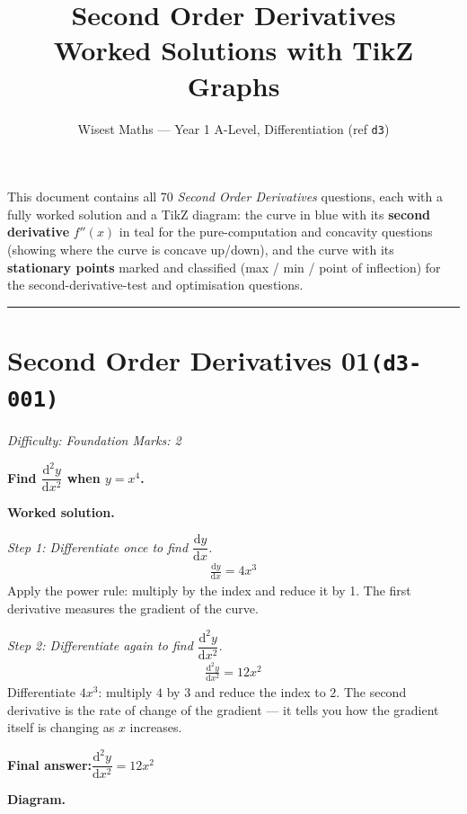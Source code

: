 \documentclass[11pt]{article}
\title{\textbf{Second Order Derivatives}\\[0.3em]\large Worked Solutions with TikZ Graphs}
\author{Wisest Maths --- Year 1 A-Level, Differentiation (ref \texttt{d3})}
\date{}
\newcommand{\question}[1]{\par\medskip\noindent\textbf{#1}\par}
\begin{document}
\maketitle
\noindent This document contains all 70 \emph{Second Order Derivatives} questions, each with a fully
worked solution and a TikZ diagram: the curve in blue with its \textbf{second derivative} $f''(x)$ in teal
for the pure-computation and concavity questions (showing where the curve is concave up/down), and the
curve with its \textbf{stationary points} marked and classified (max / min / point of inflection) for the
second-derivative-test and optimisation questions.
\tableofcontents
\bigskip
\hrule

\section*{Second Order Derivatives 01\quad\small\texttt{(d3-001)}}
\textit{Difficulty: Foundation \quad\textbar\quad Marks: 2}

\question{Find \( \dfrac{\mathrm{d}^2y}{\mathrm{d}x^2} \) when \( y = x^4 \).}

\textbf{Worked solution.}

\textit{Step 1: Differentiate once to find \( \dfrac{\mathrm{d}y}{\mathrm{d}x} \).}
\[\begin{gathered}
\frac{\mathrm{d}y}{\mathrm{d}x} = 4x^3
\end{gathered}\]
Apply the power rule: multiply by the index and reduce it by 1. The first derivative measures the gradient of the curve.

\textit{Step 2: Differentiate again to find \( \dfrac{\mathrm{d}^2y}{\mathrm{d}x^2} \).}
\[\begin{gathered}
\frac{\mathrm{d}^2y}{\mathrm{d}x^2} = 12x^2
\end{gathered}\]
Differentiate \(4x^3\): multiply \(4\) by \(3\) and reduce the index to \(2\). The second derivative is the rate of change of the gradient --- it tells you how the gradient itself is changing as \(x\) increases.

\begin{answerbox}
\textbf{Final answer:}\quad \(\displaystyle  \dfrac{\mathrm{d}^2y}{\mathrm{d}x^2} = 12x^2 \)
\end{answerbox}
\textbf{Diagram.}
\end{document}

